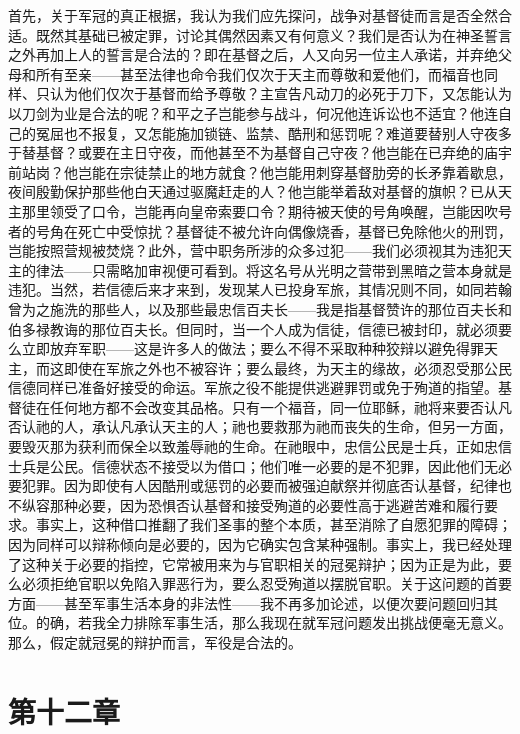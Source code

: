 首先，关于军冠的真正根据，我认为我们应先探问，战争对基督徒而言是否全然合适。既然其基础已被定罪，讨论其偶然因素又有何意义？我们是否认为在神圣誓言之外再加上人的誓言是合法的？即在基督之后，人又向另一位主人承诺，并弃绝父母和所有至亲——甚至法律也命令我们仅次于天主而尊敬和爱他们，而福音也同样、只认为他们仅次于基督而给予尊敬？主宣告凡动刀的必死于刀下，又怎能认为以刀剑为业是合法的呢？和平之子岂能参与战斗，何况他连诉讼也不适宜？他连自己的冤屈也不报复，又怎能施加锁链、监禁、酷刑和惩罚呢？难道要替别人守夜多于替基督？或要在主日守夜，而他甚至不为基督自己守夜？他岂能在已弃绝的庙宇前站岗？他岂能在宗徒禁止的地方就食？他岂能用刺穿基督肋旁的长矛靠着歇息，夜间殷勤保护那些他白天通过驱魔赶走的人？他岂能举着敌对基督的旗帜？已从天主那里领受了口令，岂能再向皇帝索要口令？期待被天使的号角唤醒，岂能因吹号者的号角在死亡中受惊扰？基督徒不被允许向偶像烧香，基督已免除他火的刑罚，岂能按照营规被焚烧？此外，营中职务所涉的众多过犯——我们必须视其为违犯天主的律法——只需略加审视便可看到。将这名号从光明之营带到黑暗之营本身就是违犯。当然，若信德后来才来到，发现某人已投身军旅，其情况则不同，如同若翰曾为之施洗的那些人，以及那些最忠信百夫长——我是指基督赞许的那位百夫长和伯多禄教诲的那位百夫长。但同时，当一个人成为信徒，信德已被封印，就必须要么立即放弃军职——这是许多人的做法；要么不得不采取种种狡辩以避免得罪天主，而这即使在军旅之外也不被容许；要么最终，为天主的缘故，必须忍受那公民信德同样已准备好接受的命运。军旅之役不能提供逃避罪罚或免于殉道的指望。基督徒在任何地方都不会改变其品格。只有一个福音，同一位耶稣，祂将来要否认凡否认祂的人，承认凡承认天主的人；祂也要救那为祂而丧失的生命，但另一方面，要毁灭那为获利而保全以致羞辱祂的生命。在祂眼中，忠信公民是士兵，正如忠信士兵是公民。信德状态不接受以为借口；他们唯一必要的是不犯罪，因此他们无必要犯罪。因为即使有人因酷刑或惩罚的必要而被强迫献祭并彻底否认基督，纪律也不纵容那种必要，因为恐惧否认基督和接受殉道的必要性高于逃避苦难和履行要求。事实上，这种借口推翻了我们圣事的整个本质，甚至消除了自愿犯罪的障碍；因为同样可以辩称倾向是必要的，因为它确实包含某种强制。事实上，我已经处理了这种关于必要的指控，它常被用来为与官职相关的冠冕辩护；因为正是为此，要么必须拒绝官职以免陷入罪恶行为，要么忍受殉道以摆脱官职。关于这问题的首要方面——甚至军事生活本身的非法性——我不再多加论述，以便次要问题回归其位。的确，若我全力排除军事生活，那么我现在就军冠问题发出挑战便毫无意义。那么，假定就冠冕的辩护而言，军役是合法的。\par


\section{第十二章}


